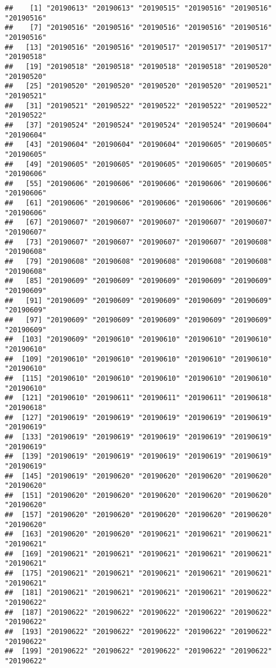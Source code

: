 \documentclass[]{article}
\begin{document}
\begin{verbatim}
##    [1] "20190613" "20190613" "20190515" "20190516" "20190516" "20190516"
##    [7] "20190516" "20190516" "20190516" "20190516" "20190516" "20190516"
##   [13] "20190516" "20190516" "20190517" "20190517" "20190517" "20190518"
##   [19] "20190518" "20190518" "20190518" "20190518" "20190520" "20190520"
##   [25] "20190520" "20190520" "20190520" "20190520" "20190521" "20190521"
##   [31] "20190521" "20190522" "20190522" "20190522" "20190522" "20190522"
##   [37] "20190524" "20190524" "20190524" "20190524" "20190604" "20190604"
##   [43] "20190604" "20190604" "20190604" "20190605" "20190605" "20190605"
##   [49] "20190605" "20190605" "20190605" "20190605" "20190605" "20190606"
##   [55] "20190606" "20190606" "20190606" "20190606" "20190606" "20190606"
##   [61] "20190606" "20190606" "20190606" "20190606" "20190606" "20190606"
##   [67] "20190607" "20190607" "20190607" "20190607" "20190607" "20190607"
##   [73] "20190607" "20190607" "20190607" "20190607" "20190608" "20190608"
##   [79] "20190608" "20190608" "20190608" "20190608" "20190608" "20190608"
##   [85] "20190609" "20190609" "20190609" "20190609" "20190609" "20190609"
##   [91] "20190609" "20190609" "20190609" "20190609" "20190609" "20190609"
##   [97] "20190609" "20190609" "20190609" "20190609" "20190609" "20190609"
##  [103] "20190609" "20190610" "20190610" "20190610" "20190610" "20190610"
##  [109] "20190610" "20190610" "20190610" "20190610" "20190610" "20190610"
##  [115] "20190610" "20190610" "20190610" "20190610" "20190610" "20190610"
##  [121] "20190610" "20190611" "20190611" "20190611" "20190618" "20190618"
##  [127] "20190619" "20190619" "20190619" "20190619" "20190619" "20190619"
##  [133] "20190619" "20190619" "20190619" "20190619" "20190619" "20190619"
##  [139] "20190619" "20190619" "20190619" "20190619" "20190619" "20190619"
##  [145] "20190619" "20190620" "20190620" "20190620" "20190620" "20190620"
##  [151] "20190620" "20190620" "20190620" "20190620" "20190620" "20190620"
##  [157] "20190620" "20190620" "20190620" "20190620" "20190620" "20190620"
##  [163] "20190620" "20190620" "20190621" "20190621" "20190621" "20190621"
##  [169] "20190621" "20190621" "20190621" "20190621" "20190621" "20190621"
##  [175] "20190621" "20190621" "20190621" "20190621" "20190621" "20190621"
##  [181] "20190621" "20190621" "20190621" "20190621" "20190622" "20190622"
##  [187] "20190622" "20190622" "20190622" "20190622" "20190622" "20190622"
##  [193] "20190622" "20190622" "20190622" "20190622" "20190622" "20190622"
##  [199] "20190622" "20190622" "20190622" "20190622" "20190622" "20190622"

\end{verbatim}
\end{document}
